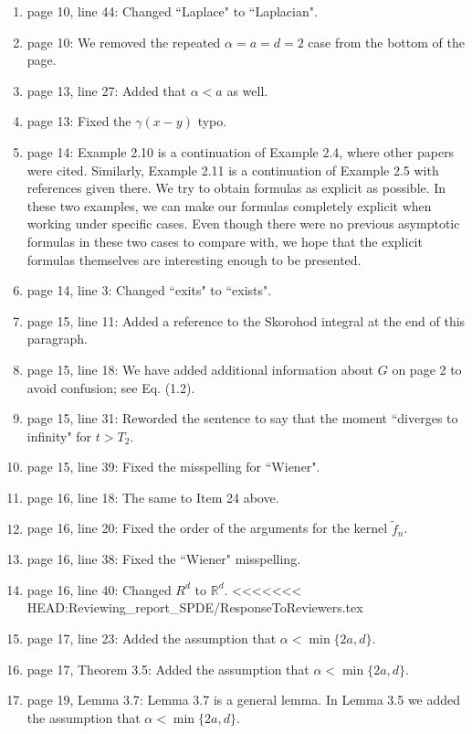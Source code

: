 \documentclass[12pt]{article}%
\theoremstyle{plain}
\theoremstyle{definition}
\def\R{\mathbb{R}}
\numberwithin{equation}{section}
\begin{document}
\begin{enumerate}
  \item[17.] page 10, line 44: Changed ``Laplace" to ``Laplacian".
  \item[18.] page 10: We removed the repeated $\alpha = a = d =2$ case from the
    bottom of the page.
  \item[19.] page 13, line 27: Added that $\alpha<a$ as well.
  \item[20.] page 13: Fixed the $\gamma(x-y)$ typo.
  \item[21.] page 14: Example 2.10 is a continuation of Example 2.4, where
    other papers were cited. Similarly, Example 2.11 is a continuation of
    Example 2.5 with references given there. We try to obtain formulas as
    explicit as possible. In these two examples, we can make our formulas
    completely explicit when working under specific cases. Even though there
    were no previous asymptotic formulas in these two cases to compare with, we
    hope that the explicit formulas themselves are interesting enough to be
    presented.
  \item[22.] page 14, line 3: Changed ``exits" to ``exists".
  \item[23.] page 15, line 11: Added a reference to the Skorohod integral at
    the end of this paragraph.
  \item[24.] page 15, line 18: We have added additional information about $G$
    on page 2 to avoid confusion; see Eq. (1.2).
  \item[25.] page 15, line 31: Reworded the sentence to say that the moment
    ``diverges to infinity" for $t>T_2$.
  \item[26.] page 15, line 39: Fixed the misspelling for ``Wiener".
  \item[27.] page 16, line 18: The same to Item 24 above.
  \item[28.] page 16, line 20: Fixed the order of the arguments for the kernel
    $\tilde{f}_n$.
  \item[29.] page 16, line 38: Fixed the ``Wiener" misspelling.
  \item[30.] page 16, line 40: Changed $R^d$ to $\R^d$.
<<<<<<< HEAD:Reviewing_report_SPDE/ResponseToReviewers.tex
  \item[31.] page 17, line 23: Added the assumption that $\alpha <
    \min\{2a,d\}$.
  \item[32.] page 17, Theorem 3.5: Added the assumption that $\alpha <
    \min\{2a,d\}$.
  \item[33.] page 19, Lemma 3.7: Lemma 3.7 is a general lemma. In Lemma 3.5 we
    added the assumption that $\alpha < \min\{2a,d\}$.

\end{enumerate}
\end{document}

